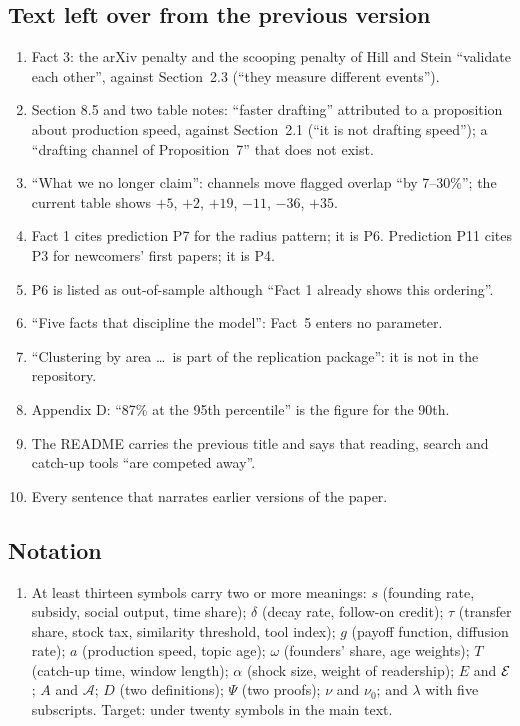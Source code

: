 \subsection*{Text left over from the previous version}
\begin{enumerate}[resume]
\item Fact 3: the arXiv penalty and the scooping penalty of Hill and Stein ``validate each other'', against Section~2.3 (``they measure different events'').
\item Section 8.5 and two table notes: ``faster drafting'' attributed to a proposition about production speed, against Section~2.1 (``it is not drafting speed''); a ``drafting channel of Proposition~7'' that does not exist.
\item ``What we no longer claim'': channels move flagged overlap ``by 7--30\%''; the current table shows $+5$, $+2$, $+19$, $-11$, $-36$, $+35$.
\item Fact 1 cites prediction P7 for the radius pattern; it is P6. Prediction P11 cites P3 for newcomers' first papers; it is P4.
\item P6 is listed as out-of-sample although ``Fact 1 already shows this ordering''.
\item ``Five facts that discipline the model'': Fact~5 enters no parameter.
\item ``Clustering by area \ldots\ is part of the replication package'': it is not in the repository.
\item Appendix D: ``87\% at the 95th percentile'' is the figure for the 90th.
\item The README carries the previous title and says that reading, search and catch-up tools ``are competed away''.
\item Every sentence that narrates earlier versions of the paper.
\end{enumerate}

\subsection*{Notation}
\begin{enumerate}[resume]
\item At least thirteen symbols carry two or more meanings: $s$ (founding rate, subsidy, social output, time share); $\delta$ (decay rate, follow-on credit); $\tau$ (transfer share, stock tax, similarity threshold, tool index); $g$ (payoff function, diffusion rate); $a$ (production speed, topic age); $\omega$ (founders' share, age weights); $T$ (catch-up time, window length); $\alpha$ (shock size, weight of readership); $E$ and $\mathcal{E}$; $A$ and $\mathcal A$; $D$ (two definitions); $\Psi$ (two proofs); $\nu$ and $\nu_0$; and $\lambda$ with five subscripts. Target: under twenty symbols in the main text.
\end{enumerate}

